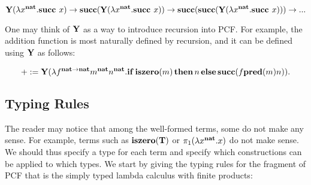 
$$\textbf{Y}(\lambda x^{\textbf{nat}}. \textbf{succ } x) \to \textbf{succ}(\textbf{Y}(\lambda x^{\textbf{nat}}. \textbf{succ } x)) \to \textbf{succ}(\textbf{succ}(\textbf{Y}(\lambda x^{\textbf{nat}}. \textbf{succ } x))) \to ...$$

One may think of $\textbf{Y}$ as a way to introduce recursion into PCF. For example, the addition function is most naturally defined by recursion, and it can be defined using $\textbf{Y}$ as follows:

\[ + := \textbf{Y}(\lambda f^{\mathbf{nat}\to\mathbf{nat}}m^\mathbf{nat}n^\mathbf{nat}.\mathbf{if}\,\mathbf{iszero}(m)\,\mathbf{then}\,n\,\mathbf{else }\,\mathbf{succ}(f \mathbf{pred}(m) n)). \]

\subsection{Typing Rules}

The reader may notice that among the well-formed terms, some do not make any sense. For example, terms such as $\mathbf{iszero}(\mathbf{T})$ or $\pi_1(\lambda x^\mathbf{nat}.x)$ do not make sense. We should thus specify a type for each term and specify which constructions can be applied to which types. We start by giving the typing rules for the fragment of PCF that is the simply typed lambda calculus with finite products:

